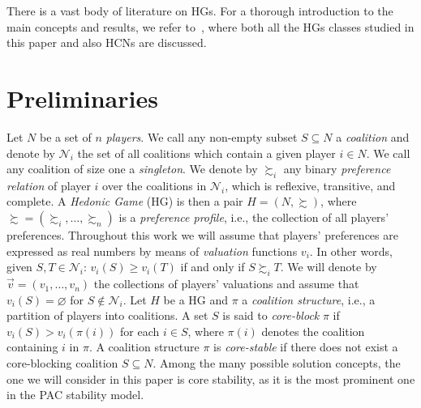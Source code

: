 \documentclass[letterpaper]{article} %
\newcommand{\Ni}{\mathcal{N}_i}
\begin{document}
There is a vast body of literature on HGs. For a thorough introduction to the main concepts and results, we refer to~\citet{AzizS16}, where both all the HGs classes studied in this paper and also HCNs are discussed.

\section{Preliminaries}
Let $N$ be a set of $n$ \emph{players}. We call any non-empty subset $S \subseteq N$ a \emph{coalition} and denote by $\Ni$ the set of all coalitions which contain a given player $i \in N$. We call any coalition of size one a \emph{singleton}.
We denote by $\succsim_i$ any binary \emph{preference relation} of player $i$ over the coalitions in $\Ni$, which is reflexive, transitive, and complete.
A \emph{Hedonic Game} (HG) is then a pair $H=( N, \succsim )$, where $\succsim = (\succsim_i, \ldots, \succsim_n)$ is a \emph{preference profile}, i.e., the collection of all players' preferences.
Throughout this work we will assume that players' preferences are expressed as real numbers by means of \emph{valuation} functions $v_i$. In other words, given $S,T \in \Ni$: $v_i(S) \geq v_i(T)$ if and only if $S \succsim_i T$. We will denote by $\vec{v}=(v_1,\ldots, v_n)$ the collections of players' valuations and assume that $v_i(S)=\varnothing$ for $S\notin \Ni$.
Let $H$ be a HG and $\pi$ a \emph{coalition structure}, i.e., a partition of players into coalitions. A set $S$ is said to \emph{core-block} $\pi$ if $v_i(S) > v_i(\pi(i))$ for each $i \in S$, where $\pi(i)$ denotes the coalition containing $i$ in $\pi$.
A coalition structure $\pi$ is \emph{core-stable} if there does not exist a core-blocking coalition $S \subseteq N$. Among the many possible solution concepts, the one we will consider in this paper is core stability, as it is the most prominent one in the PAC stability model.
\end{document}
